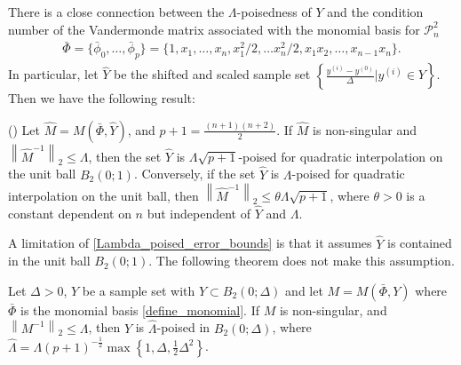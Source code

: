 There is a close connection between the $\Lambda$-poisedness of $Y$ and the condition number of the Vandermonde matrix 
associated with the monomial basis for $\mathcal{P}^2_n$
\begin{align}
\label{define_monomial}
\bar{\Phi} = \{ \bar{\phi}_0, \ldots, \bar{\phi}_p\} =\{1, x_1, \ldots, x_n, x_1^2/2, \ldots x_n^2/2,x_1 x_2, \ldots, x_{n-1}x_{n}\}.
\end{align}
In particular, let $\hat{Y}$ be the shifted and scaled sample set 
$\left\{\frac{y^{(i)}-y^{(0)}}{\Delta}|y^{(i)} \in Y\right\}$.
Then we have the following result:

\begin{theorem}
\label{Lambda_poised_error_bounds}

(\cite[Theorem 3.14]{introduction_book})
Let $\hat{M} = M(\bar{\Phi},\hat{Y})$, and $p + 1 = \frac{(n+1)(n+2)}{2}$.
If $\hat{M}$ is non-singular and $\left\|\hat{M}^{-1}\right\|_2 \le \Lambda$,   
then the set $\hat{Y}$ is $\Lambda  \sqrt{p+1}$-poised for quadratic interpolation on the unit ball $B_2(0;1)$.  
Conversely, if the set $\hat{Y}$ is $\Lambda$-poised for quadratic interpolation on the unit ball, 
then $\left\|\hat{M}^{-1}\right\|_2 \le \theta \Lambda \sqrt{p+1}$, where $\theta > 0$ is a 
constant dependent on $n$ but independent of $\hat{Y}$ and $\Lambda$.
\end{theorem}

A limitation of \cref{Lambda_poised_error_bounds} is that it assumes $\hat{Y}$ is contained in the unit ball $B_2(0;1)$.
The following theorem does not make this assumption.

\begin{theorem}
\label{Lambda_poised_error_bounds_delta}

Let $\Delta >0$, $Y$ be a sample set with $Y \subset B_2(0;\Delta)$ and let $M=M(\bar{\Phi},Y)$ where $\bar{\Phi}$ is the monomial basis \cref{define_monomial}.
If $M$ is non-singular, and $\left\|{M^{-1}}\right\|_2 \le \Lambda$, then $Y$ is $\hat{\Lambda}$-poised in $B_2(0;\Delta)$,
where $\hat{\Lambda} = \Lambda \left(p+1\right)^{-\frac 1 2}\max\left\{1, \Delta, \frac 1 2 \Delta^2\right\}$.
\end{theorem}


